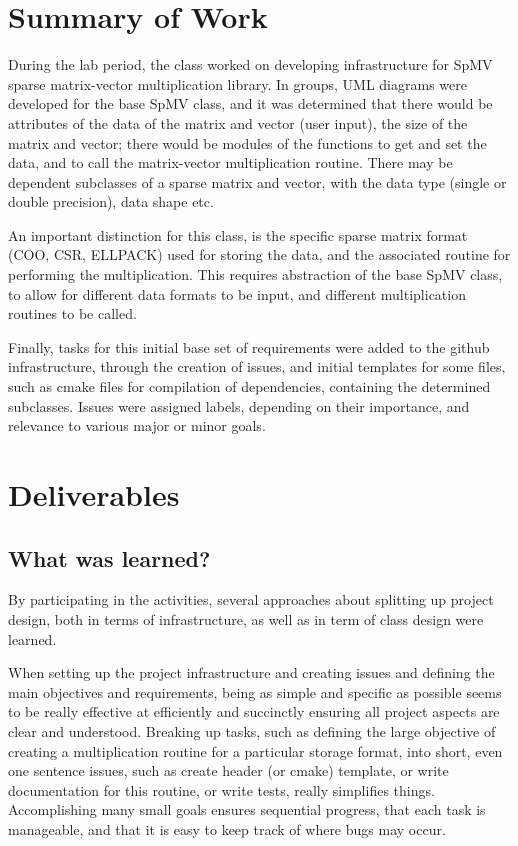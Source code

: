 \documentclass[letterpaper]{article}
\title{\Large\doctitle}
\author{\docauthor}
\affil{\docaffil}
\date{\today}%
\begin{document}
\maketitle
\pagestyle{fancy}

\section{Summary of Work}
During the lab period, the class worked on developing infrastructure for SpMV sparse matrix-vector multiplication library. In groups, UML diagrams were developed for the base SpMV class, and it was determined that there would be attributes of the data of the matrix and vector (user input), the size of the matrix and vector; there would be modules of the functions to get and set the data, and to call the matrix-vector multiplication routine. There may be dependent subclasses of a sparse matrix and vector, with the data type (single or double precision), data shape etc.

An important distinction for this class, is the specific sparse matrix format (COO, CSR, ELLPACK) used for storing the data, and the associated routine for performing the multiplication. This requires abstraction of the base SpMV class, to allow for different data formats to be input, and different multiplication routines to be called.

Finally, tasks for this initial base set of requirements were added to the github infrastructure, through the creation of issues, and initial templates for some files, such as cmake files for compilation of dependencies, containing the determined subclasses. Issues were assigned labels, depending on their importance, and relevance to various major or minor goals.

\section{Deliverables}

\subsection{What was learned?}
By participating in the activities, several approaches about splitting up project design, both in terms of infrastructure, as well as in term of class design were learned. 

When setting up the project infrastructure and creating issues and defining the main objectives and requirements, being as simple and specific as possible seems to be really effective at efficiently and succinctly ensuring all project aspects are clear and understood. Breaking up tasks, such as defining the large objective of creating a multiplication routine for a particular storage format, into short, even one sentence issues, such as create header (or cmake) template, or write documentation for this routine, or write tests, really simplifies things. Accomplishing many small goals ensures sequential progress, that each task is manageable, and that it is easy to keep track of where bugs may occur.
\end{document}

